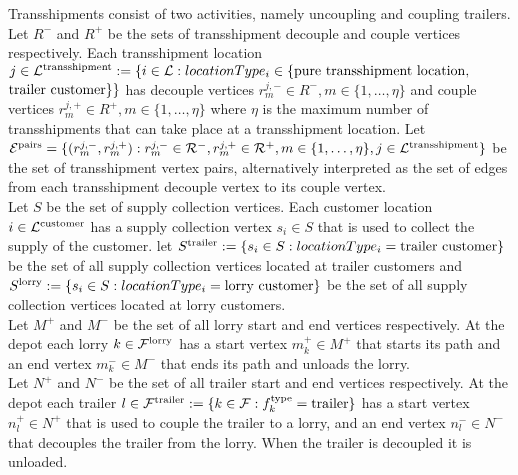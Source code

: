 Transshipments consist of two activities, namely uncoupling and coupling trailers.
Let
$ R^- $ and $R^+$
be the sets of transshipment decouple and couple vertices respectively.
Each transshipment location
$j \in \mathcal L^{\rm transshipment} :=
\{ i \in \mathcal L: locationType_i \in  \{ {\rm \text{pure transshipment location}}, $ $  {\rm \text{trailer customer}} \} \} $
has decouple vertices
$ r^{j,-}_m \in  R^-, m \in \{ 1,\ldots,\eta \}  $
and  couple vertices
$ r^{j,+}_m \in R^+, m \in \{ 1,\ldots,\eta \}   $
where $\eta$ is the maximum number of transshipments that can take place at a transshipment location.
 Let
 $\mathcal E^{\rm pairs} = \{  (r^{j,-}_m,r^{j,+}_m ) : r^{j,-}_m \in \mathcal R^- , r^{j,+}_m \in \mathcal R^+, m \in \{ 1,\ldots, \eta \},  j \in \mathcal L^{\rm transshipment}   \}$
 be the set of transshipment vertex pairs, alternatively interpreted as the set of edges from each transshipment decouple vertex to its couple vertex. \\


Let $S$ be the set of supply collection vertices.
Each customer location
$i \in \mathcal L^{\rm customer} $
has a supply collection vertex
$s_{i} \in S$
that is used to collect the supply of the customer.
let
$S^{\rm trailer} := \{ s_i \in S: locationType_i = \text{trailer customer} \}$
be the set of all supply collection vertices located at trailer customers and
$S^{\rm lorry} := \{ s_i \in S: locationType_i = \text{lorry customer} \}$
be the set of all supply collection vertices located at lorry customers.
\\

Let $M^{+} $ and $M^{-} $ be the set of all lorry start and end vertices respectively.
At the depot each lorry
$k \in \mathcal F^{\rm lorry} $
has a start vertex
$m^+_k \in M^{+} $
that starts its path and an end vertex
$m^-_k \in M^{-} $
that ends its path and unloads the lorry.\\


Let $N^{+} $ and $N^{-} $ be the set of all trailer start and end vertices respectively.
At the depot each trailer
$l \in \mathcal F^{\rm trailer} :=
\{k \in \mathcal F: f^{\rm type}_k = \rm trailer\} $
has a start vertex
$n^+_l \in N^{+} $
that is used to couple the trailer to a lorry, and an end vertex
$n^-_l \in N^{-} $
that decouples the trailer from the lorry. When the trailer is decoupled it is unloaded.\\


